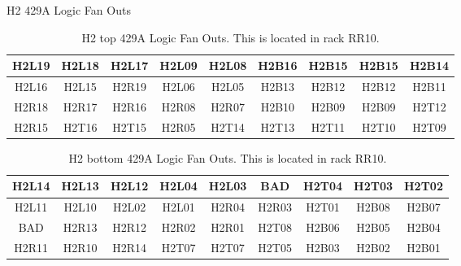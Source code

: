 \documentclass[10pt, xcolor={dvipsnames}, aspectratio = 169, sans,mathserif]{beamer}
\begin{document}
\begin{frame}{H2 429A Logic Fan Outs}

\begin{table}
\begin{center}
\begin{tabular}{|c|c|c|c|c|c|c|c|c|}
\hline
H2L19 & H2L18 & H2L17 & H2L09 & H2L08 & H2B16 & H2B15 & H2B15 & H2B14 \\
\hline
H2L16 & H2L15 & H2R19 & H2L06 & H2L05 & H2B13 & H2B12 & H2B12 & H2B11 \\
\hline
H2R18 & H2R17 & H2R16 & H2R08 & H2R07 & H2B10 & H2B09 & H2B09 & H2T12 \\
\hline
H2R15 & H2T16 & H2T15 & H2R05 & H2T14 & H2T13 & H2T11 & H2T10 & H2T09 \\
\hline
\end{tabular}
\caption{H2 top 429A Logic Fan Outs. This is located in rack RR10.}
\end{center}
\end{table}

\begin{table}
\begin{center}
\begin{tabular}{|c|c|c|c|c|c|c|c|c|}
\hline
H2L14 & H2L13 & H2L12 & H2L04 & H2L03 & BAD   & H2T04 & H2T03 & H2T02 \\
\hline
H2L11 & H2L10 & H2L02 & H2L01 & H2R04 & H2R03 & H2T01 & H2B08 & H2B07 \\
\hline
BAD   & H2R13 & H2R12 & H2R02 & H2R01 & H2T08 & H2B06 & H2B05 & H2B04 \\
\hline
H2R11 & H2R10 & H2R14 & H2T07 & H2T07 & H2T05 & H2B03 & H2B02 & H2B01 \\
\hline
\end{tabular}
\caption{H2 bottom 429A Logic Fan Outs. This is located in rack RR10.}
\end{center}
\end{table}

\end{frame}
\end{document}
